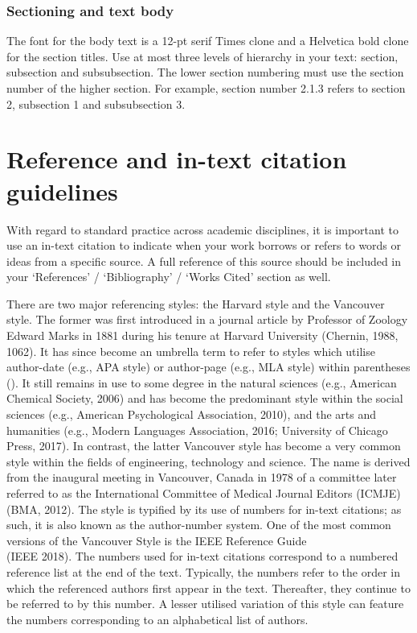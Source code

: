 \documentclass[english, 12pt, a4paper, sci, utf8, a-2b, online]{aaltothesis}
\begin{document}
\subsubsection*{Sectioning and text body}

The font for the body text is a 12-pt serif Times clone and a Helvetica bold 
clone for the section titles. Use at most three levels of hierarchy in your 
text: section, subsection and subsubsection. The lower section numbering must 
use the section number of the higher section. For example, section number 2.1.3 
refers to section 2, subsection 1 and subsubsection 3.

\clearpage
\section{Reference and in-text citation guidelines}
\label{app:reference}

With regard to standard practice across academic disciplines, it is important to
use an in-text citation to indicate when your work borrows or refers to words or
ideas from a specific source. A full reference of this source should be included
in your ‘References’ / ‘Bibliography’ / ‘Works Cited’ section as well.

There are two major referencing styles: the Harvard style and the Vancouver 
style. The former was first introduced in a journal article by Professor of 
Zoology Edward Marks in 1881 during his tenure at Harvard University (Chernin, 
1988, 1062). It has since become an umbrella term to refer to styles which 
utilise author-date (e.g., APA style) or author-page (e.g., MLA style) within 
parentheses (). It still remains in use to some degree in the natural sciences 
(e.g., American Chemical Society, 2006) and has become the predominant style 
within the social sciences (e.g., American Psychological Association, 2010), and
the arts and humanities (e.g., Modern Languages Association, 2016; University of
Chicago Press, 2017). In contrast, the latter Vancouver style has become a very 
common style within the fields of engineering, technology and science. The name 
is derived from the inaugural meeting in Vancouver, Canada in 1978 of a 
committee later referred to as the International Committee of Medical Journal 
Editors (ICMJE) (BMA, 2012). The style is typified by its use of numbers for 
in-text citations; as such, it is also known as the author-number system. One of
the most common versions of the Vancouver Style is the IEEE Reference Guide \\
(IEEE 2018). The numbers used for in-text citations correspond to a numbered 
reference list at the end of the text. Typically, the numbers refer to the order
in which the referenced authors first appear in the text. Thereafter, they 
continue to be referred to by this number. A lesser utilised variation of this 
style can feature the numbers corresponding to an alphabetical list of authors.
\end{document}
